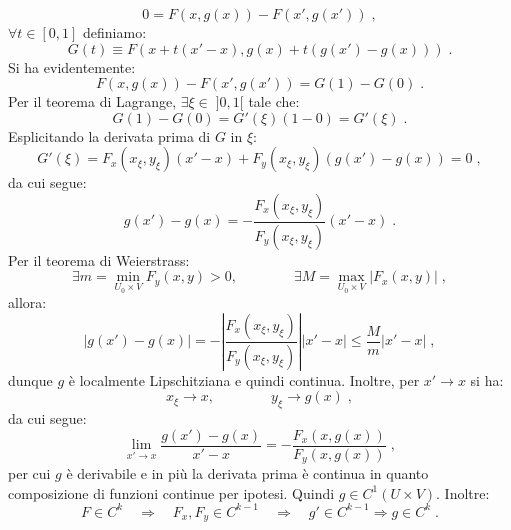 \documentclass[a4paper,12pt]{report}
\theoremstyle{plain}
\theoremstyle{definition}
\theoremstyle{remark}
\numberwithin{equation}{section}
\begin{document}
\begin{equation}
0=F(x,g(x))-F(x',g(x'))\;,
\end{equation}
$\forall t \in [0,1]$ definiamo:
\begin{equation}
G(t)\equiv F(x+t(x'-x), g(x)+t(g(x')-g(x)))\;.
\end{equation}
Si ha evidentemente:
\begin{equation}
F(x,g(x))-F(x',g(x')) = G(1)-G(0)\;.
\end{equation}
Per il teorema di Lagrange, $\exists \xi \in\; ]0,1[$ tale che:
\begin{equation}
G(1)-G(0)=G'(\xi)(1-0)=G'(\xi)\;.
\end{equation}
Esplicitando la derivata prima di $G$ in $\xi$:
\begin{equation}
G'(\xi)= F_x(x_{\xi},y_{\xi})(x'-x)+F_y(x_{\xi},y_{\xi})(g(x')-g(x))=0\;,
\end{equation}
da cui segue:
\begin{equation}
g(x')-g(x)=-\frac{F_x(x_{\xi},y_{\xi})}{F_y(x_{\xi},y_{\xi})}(x'-x)\;.
\end{equation}
Per il teorema di Weierstrass:
\begin{equation}
\exists m=\min_{U_0 \times V} F_y(x,y)>0, \qquad\qquad \exists M=\max_{U_0 \times V} |F_x(x,y)|\;,
\end{equation}
allora:
\begin{equation}
|g(x')-g(x)|=-\left|\frac{F_x(x_{\xi},y_{\xi})}{F_y(x_{\xi},y_{\xi})}\right| |x'-x| \le \frac{M}{m}|x'-x|\;,
\end{equation}
dunque $g$ è localmente Lipschitziana e quindi continua. Inoltre, per $x' \to x$ si ha:
\begin{equation}
x_{\xi} \to x, \qquad\qquad y_{\xi} \to g(x)\;,
\end{equation}
da cui segue:
\begin{equation}
\lim_{x' \to x} \frac{g(x')-g(x)}{x'-x} = -\frac{F_x(x,g(x))}{F_y(x,g(x))}\;,
\end{equation}
per cui $g$ è derivabile e in più la derivata prima è continua in quanto composizione di funzioni continue per ipotesi. Quindi
$g \in C^1(U \times V)$. Inoltre:
\begin{equation}
F \in C^k\quad  \Longrightarrow\quad  F_x,F_y \in C^{k-1}\quad \Longrightarrow\quad g' \in C^{k-1} \Longrightarrow g \in C^k\;.
\end{equation}
\endproof
\end{document}
